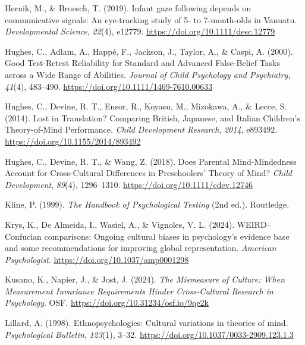 \documentclass[
  man,floatsintext]{apa7}
\newlength{\cslhangindent}
\newenvironment{CSLReferences}[2] %
 {\begin{list}{}{%
  \setlength{\itemindent}{0pt}
  \setlength{\leftmargin}{0pt}
  \setlength{\parsep}{0pt}
  \ifodd #1
   \setlength{\leftmargin}{\cslhangindent}
   \setlength{\itemindent}{-1\cslhangindent}
  \fi
  \setlength{\itemsep}{#2\baselineskip}}}
 {\end{list}}
\begin{document}
\begin{CSLReferences}{1}{0}
Hernik, M., \& Broesch, T. (2019). Infant gaze following depends on communicative signals: {An} eye-tracking study of 5- to 7-month-olds in {Vanuatu}. \emph{Developmental Science}, \emph{22}(4), e12779. \url{https://doi.org/10.1111/desc.12779}

Hughes, C., Adlam, A., Happé, F., Jackson, J., Taylor, A., \& Caspi, A. (2000). Good {Test}-{Retest Reliability} for {Standard} and {Advanced False}-{Belief Tasks} across a {Wide Range} of {Abilities}. \emph{Journal of Child Psychology and Psychiatry}, \emph{41}(4), 483--490. \url{https://doi.org/10.1111/1469-7610.00633}

Hughes, C., Devine, R. T., Ensor, R., Koyasu, M., Mizokawa, A., \& Lecce, S. (2014). Lost in {Translation}? {Comparing British}, {Japanese}, and {Italian Children}'s {Theory-of-Mind Performance}. \emph{Child Development Research}, \emph{2014}, e893492. \url{https://doi.org/10.1155/2014/893492}

Hughes, C., Devine, R. T., \& Wang, Z. (2018). Does {Parental Mind-Mindedness Account} for {Cross-Cultural Differences} in {Preschoolers}' {Theory} of {Mind}? \emph{Child Development}, \emph{89}(4), 1296--1310. \url{https://doi.org/10.1111/cdev.12746}

Kline, P. (1999). \emph{The {Handbook} of {Psychological Testing}} (2nd ed.). Routledge.

Krys, K., De Almeida, I., Wasiel, A., \& Vignoles, V. L. (2024). {WEIRD}--{Confucian} comparisons: {Ongoing} cultural biases in psychology's evidence base and some recommendations for improving global representation. \emph{American Psychologist}. \url{https://doi.org/10.1037/amp0001298}

Kusano, K., Napier, J., \& Jost, J. (2024). \emph{The {Mismeasure} of {Culture}: {When Measurement Invariance Requirements Hinder Cross-Cultural Research} in {Psychology}}. OSF. \url{https://doi.org/10.31234/osf.io/9qe2k}

Lillard, A. (1998). Ethnopsychologies: {Cultural} variations in theories of mind. \emph{Psychological Bulletin}, \emph{123}(1), 3--32. \url{https://doi.org/10.1037/0033-2909.123.1.3}


\end{CSLReferences}
\end{document}

